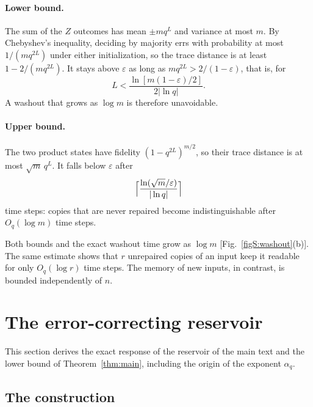 \documentclass[aps,prl,twocolumn,superscriptaddress,floatfix]{revtex4-2}
\theoremstyle{plain}
\begin{document}
\paragraph*{Lower bound.} The sum of the $Z$ outcomes has mean $\pm mq^L$ and variance at most $m$. By Chebyshev's inequality, deciding by majority errs with probability at most $1/(mq^{2L})$ under either initialization, so the trace distance is at least $1-2/(mq^{2L})$. It stays above $\varepsilon$ as long as $mq^{2L}>2/(1-\varepsilon)$, that is, for
\[
L<\frac{\ln[m(1-\varepsilon)/2]}{2|\ln q|}.
\]
A washout that grows as $\log m$ is therefore unavoidable.

\paragraph*{Upper bound.} The two product states have fidelity $(1-q^{2L})^{m/2}$, so their trace distance is at most $\sqrt m\,q^L$. It falls below $\varepsilon$ after
\[
\Bigl\lceil\frac{\ln(\sqrt m/\varepsilon)}{|\ln q|}\Bigr\rceil
\]
time steps: copies that are never repaired become indistinguishable after $O_q(\log m)$ time steps.

Both bounds and the exact washout time grow as $\log m$ [Fig.~\ref{figS:washout}(b)]. The same estimate shows that $r$ unrepaired copies of an input keep it readable for only $O_q(\log r)$ time steps. The memory of new inputs, in contrast, is bounded independently of $n$.

\section{The error-correcting reservoir}
\label{sm:rep}

This section derives the exact response of the reservoir of the main text and the lower bound of Theorem~\ref{thm:main}, including the origin of the exponent $\alpha_q$.

\subsection{The construction}
\end{document}
